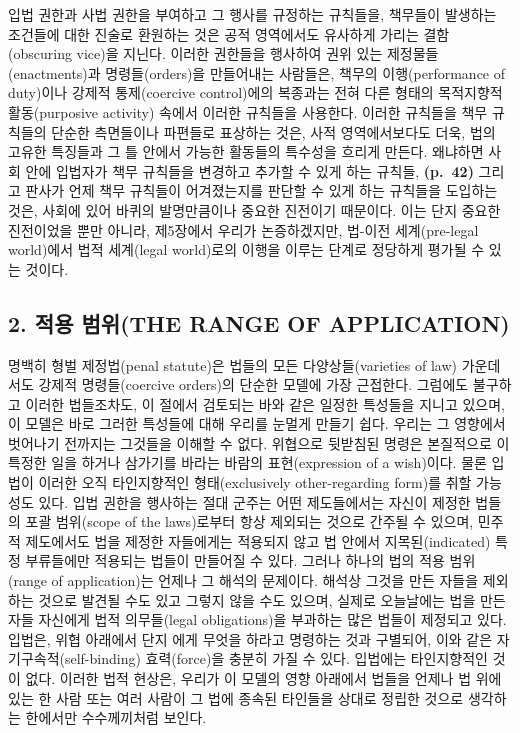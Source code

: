 입법 권한과 사법 권한을 부여하고 그 행사를 규정하는 규칙들을, 책무들이
발생하는 조건들에 대한 진술로 환원하는 것은 공적 영역에서도 유사하게
가리는 결함(obscuring vice)을 지닌다. 이러한 권한들을 행사하여 권위 있는
제정물들(enactments)과 명령들(orders)을 만들어내는 사람들은, 책무의
이행(performance of duty)이나 강제적 통제(coercive control)에의 복종과는
전혀 다른 형태의 목적지향적 활동(purposive activity) 속에서 이러한
규칙들을 사용한다. 이러한 규칙들을 책무 규칙들의 단순한 측면들이나
파편들로 표상하는 것은, 사적 영역에서보다도 더욱, 법의 고유한 특징들과
그 틀 안에서 가능한 활동들의 특수성을 흐리게 만든다. 왜냐하면 사회 안에
입법자가 책무 규칙들을 변경하고 추가할 수 있게 하는 규칙들,
\textbf{(p.~42)} 그리고 판사가 언제 책무 규칙들이 어겨졌는지를 판단할 수
있게 하는 규칙들을 도입하는 것은, 사회에 있어 바퀴의 발명만큼이나 중요한
진전이기 때문이다. 이는 단지 중요한 진전이었을 뿐만 아니라, 제5장에서
우리가 논증하겠지만, 법-이전 세계(pre-legal world)에서 법적 세계(legal
world)로의 이행을 이루는 단계로 정당하게 평가될 수 있는 것이다.

\subsection{2. 적용 범위(THE RANGE OF
APPLICATION)}\label{uxc801uxc6a9-uxbc94uxc704the-range-of-application}

명백히 형벌 제정법(penal statute)은 법들의 모든 다양상들(varieties of
law) 가운데서도 강제적 명령들(coercive orders)의 단순한 모델에 가장
근접한다. 그럼에도 불구하고 이러한 법들조차도, 이 절에서 검토되는 바와
같은 일정한 특성들을 지니고 있으며, 이 모델은 바로 그러한 특성들에 대해
우리를 눈멀게 만들기 쉽다. 우리는 그 영향에서 벗어나기 전까지는 그것들을
이해할 수 없다. 위협으로 뒷받침된 명령은 본질적으로
이 특정한 일을 하거나 삼가기를 바라는 바람의
표현(expression of a wish)이다. 물론 입법이 이러한 오직 타인지향적인
형태(exclusively other-regarding form)를 취할 가능성도 있다. 입법 권한을
행사하는 절대 군주는 어떤 제도들에서는 자신이 제정한 법들의 포괄
범위(scope of the laws)로부터 항상 제외되는 것으로 간주될 수 있으며,
민주적 제도에서도 법을 제정한 자들에게는 적용되지 않고 법 안에서
지목된(indicated) 특정 부류들에만 적용되는 법들이 만들어질 수 있다.
그러나 하나의 법의 적용 범위(range of application)는 언제나 그 해석의
문제이다. 해석상 그것을 만든 자들을 제외하는 것으로 발견될 수도 있고
그렇지 않을 수도 있으며, 실제로 오늘날에는 법을 만든 자들 자신에게 법적
의무들(legal obligations)을 부과하는 많은 법들이 제정되고 있다. 입법은,
위협 아래에서 단지 에게 무엇을 하라고 명령하는 것과
구별되어, 이와 같은 자기구속적(self-binding) 효력(force)을 충분히 가질
수 있다. 입법에는  타인지향적인 것이 없다. 이러한 법적
현상은, 우리가 이 모델의 영향 아래에서 법들을 언제나 법 위에 있는 한
사람 또는 여러 사람이 그 법에 종속된 타인들을 상대로 정립한 것으로
생각하는 한에서만 수수께끼처럼 보인다.

